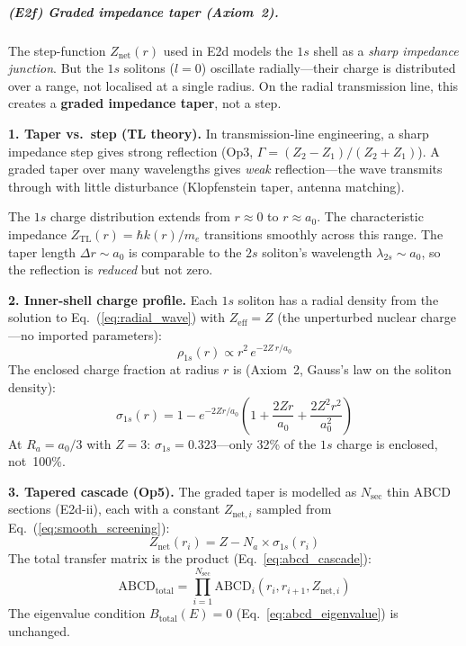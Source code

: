 \subparagraph{(E2f) Graded impedance taper (Axiom~2).}

The step-function $Z_{\text{net}}(r)$ used in
E2d models the $1s$ shell as a \emph{sharp
impedance junction}.  But the $1s$ solitons
($l{=}0$) oscillate radially---their charge is
distributed over a range, not localised at a
single radius.  On the radial transmission line,
this creates a \textbf{graded impedance taper},
not a step.

\noindent\textbf{1. Taper vs.\ step (TL theory).}
In transmission-line engineering, a sharp impedance
step gives strong reflection
(Op3, $\Gamma = (Z_2 - Z_1)/(Z_2 + Z_1)$).
A graded taper over many wavelengths gives
\emph{weak} reflection---the wave transmits
through with little disturbance (Klopfenstein
taper, antenna matching).

The $1s$ charge distribution extends from
$r \approx 0$ to $r \approx a_0$.
The characteristic impedance $Z_{\text{TL}}(r)
= \hbar k(r)/m_e$ transitions smoothly across
this range.  The taper length $\Delta r \sim a_0$
is comparable to the $2s$ soliton's wavelength
$\lambda_{2s} \sim a_0$, so the reflection is
\emph{reduced} but not zero.

\noindent\textbf{2. Inner-shell charge profile.}
Each $1s$ soliton has a radial density from the
solution to Eq.~(\ref{eq:radial_wave}) with
$Z_{\text{eff}} = Z$ (the unperturbed nuclear
charge---no imported parameters):
\begin{equation}
    \rho_{1s}(r) \propto r^2\,
    e^{-2Z\,r/a_0}
    \label{eq:1s_density}
\end{equation}
The enclosed charge fraction at radius $r$ is
(Axiom~2, Gauss's law on the soliton density):
\begin{equation}
    \sigma_{1s}(r) = 1 - e^{-2Zr/a_0}
    \left(1 + \frac{2Zr}{a_0}
    + \frac{2Z^2 r^2}{a_0^2}\right)
    \label{eq:smooth_screening}
\end{equation}
At $R_a = a_0/3$ with $Z = 3$:
$\sigma_{1s} = 0.323$---only 32\% of the
$1s$ charge is enclosed, not~100\%.

\noindent\textbf{3. Tapered cascade (Op5).}
The graded taper is modelled as $N_{\text{sec}}$
thin ABCD sections (E2d-ii), each with a constant
$Z_{\text{net},i}$ sampled from
Eq.~(\ref{eq:smooth_screening}):
\begin{equation}
    Z_{\text{net}}(r_i) = Z
    - N_a \times \sigma_{1s}(r_i)
    \label{eq:z_net_taper}
\end{equation}
The total transfer matrix is the product
(Eq.~\ref{eq:abcd_cascade}):
\begin{equation}
    \text{ABCD}_{\text{total}} =
    \prod_{i=1}^{N_{\text{sec}}}
    \text{ABCD}_i(r_i, r_{i+1},
    Z_{\text{net},i})
\end{equation}
The eigenvalue condition $B_{\text{total}}(E) = 0$
(Eq.~\ref{eq:abcd_eigenvalue}) is unchanged.

